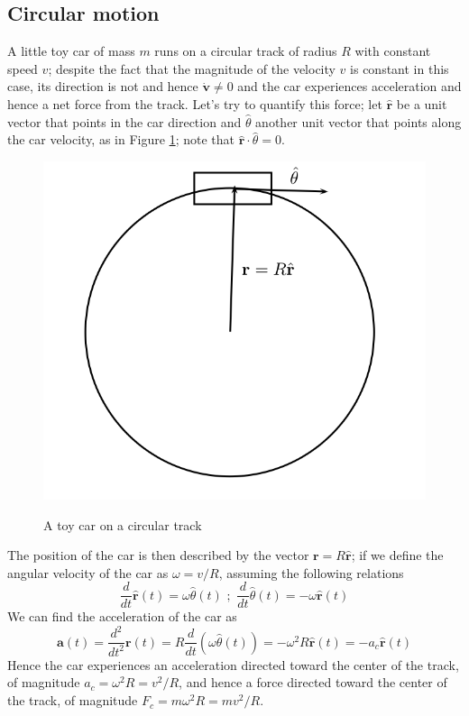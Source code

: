 \subsection{Circular motion}
A little toy car of mass $m$ runs on a circular track of radius $R$ with constant speed $v$; despite the fact that the magnitude of the velocity $v$ is constant in this case, its direction is not and hence $\dot{\mathbf{v}}\neq 0$ and the car experiences acceleration and hence a net force from the track. Let's try to quantify this force; let $\hat{\mathbf{r}}$ be a unit vector that points in the car direction and $\hat{\theta}$ another unit vector that points along the car velocity, as in Figure \ref{track}; note that $\hat{\mathbf{r}}\cdot \hat{\theta}=0$. 
\begin{figure}
\begin{center}
\includegraphics[scale=0.7]{Draw/circular.png}
\label{}
\end{center}
\caption{A toy car on a circular track}
\label{track}
\end{figure}
The position of the car is then described by the vector $\mathbf{r}=R\hat{\mathbf{r}}$; if we define the angular velocity of the car as $\omega=v/R$, assuming the following relations 
\begin{equation}
\frac{d}{dt}\hat{\mathbf{r}}(t)=\omega \hat{\theta}(t) \,\, ; \,\, \frac{d}{dt}\hat{\theta}(t)=-\omega \hat{\mathbf{r}}(t)
\end{equation}
We can find the acceleration of the car as
\begin{equation}
\label{centripetal}
\mathbf{a}(t)=\frac{d^2}{dt^2}\mathbf{r}(t)=R\frac{d}{dt}(\omega \hat{\theta}(t))=-\omega^2R\hat{\mathbf{r}}(t)=-a_c\hat{\mathbf{r}}(t) 
\end{equation}
Hence the car experiences an acceleration directed toward the center of the track, of magnitude $a_c=\omega^2R=v^2/R$, and hence a force directed toward the center of the track, of magnitude $F_c=m\omega^2 R=mv^2/R$.